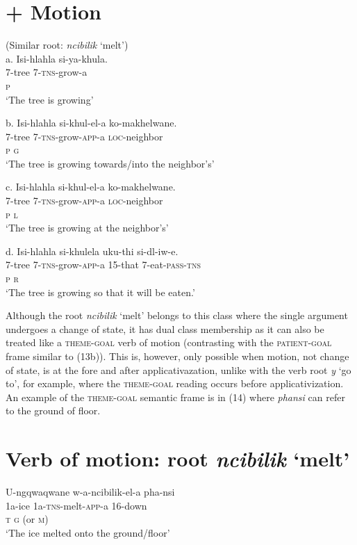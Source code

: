 \documentclass[output=paper]{langsci/langscibook}
\begin{document}
\chapter[  + Motion]{  + Motion}
       (Similar root: \textit{ncibilik} ‘melt’)\\
\gll     a.  Isi-hlahla    si-ya-khula. \\
           7-tree          7-\textsc{tns}{}-grow-a \\
           \textsc{ p}\\
\glt       ‘The tree is growing’
\z

\gll     b.  Isi-hlahla    si-khul-el-a        ko-makhelwane. \\
           7-tree          7-\textsc{tns}{}-grow-\textsc{app}{}-a     \textsc{loc}{}-neighbor \\
           \textsc{p                  g}\\
\glt       ‘The tree is growing towards/into the neighbor’s’
\z

\gll     c.  Isi-hlahla    si-khul-el-a        ko-makhelwane. \\
           7-tree          7-\textsc{tns}{}-grow-\textsc{app}{}-a  \textsc{loc}{}-neighbor \\
           \textsc{p                  l}\\
\glt       ‘The tree is growing at the neighbor’s’  
\z

\gll     d.  Isi-hlahla    si-khulela        uku-thi   si-dl-iw-e.\\
           7-tree          7-\textsc{tns}{}-grow-\textsc{app}{}-a  15-that     7-eat-\textsc{pass-tns}\\
           \textsc{p                  r}\\
\glt       ‘The tree is growing so that it will be eaten.’  
\z

Although the root \textit{ncibilik} ‘melt’ belongs to this class where the single argument undergoes a change of state, it has dual class membership as it can also be treated like a \textsc{theme-goal} verb of motion (contrasting with the \textsc{patient-goal} frame similar to (13b)). This is, however, only possible when motion, not change of state, is at the fore and after applicativazation, unlike with the verb root \textit{y }‘go to’, for example, where the \textsc{theme-goal} reading occurs before applicativization. An example of the \textsc{theme-goal} semantic frame is in (14) where \textit{phansi} can refer to the ground of floor. 

\chapter[Verb of motion: root ncibilik ‘melt’]{Verb of motion: root \textit{ncibilik} ‘melt’}
\gll   U-ngqwaqwane   w-a-ncibilik-el-a     pha-nsi\\
       1a-ice              1a-\textsc{tns}{}-melt-\textsc{app}{}-a     16-down \\
        \textsc{t                      g} (or \textsc{m})\\
\glt   ‘The ice melted onto the ground/floor’
\z
\end{document}
